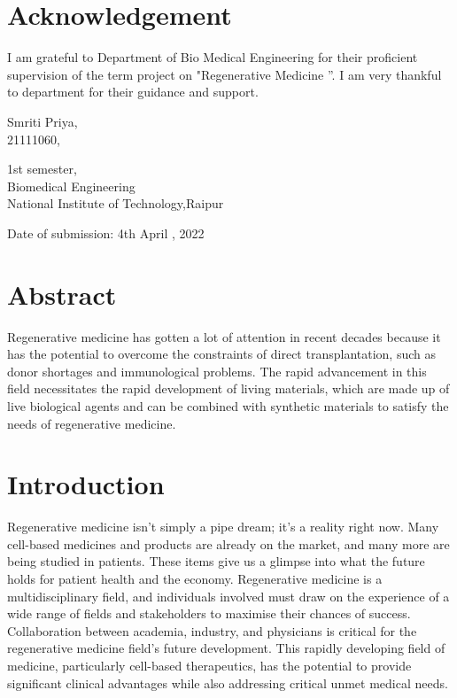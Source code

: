 \documentclass[12pt]{article}
\begin{document}
\newpage
\centering
\section*{\Huge Acknowledgement}
\vspace{3mm}
\raggedright
\LARGE I am grateful to Department of Bio Medical Engineering for their proficient supervision of the term project on "Regenerative Medicine ”. I am very thankful to department for their guidance and support.\\
	
\raggedleft

\vspace{45mm}

Smriti Priya,
\\21111060,


1st semester,
\\ Biomedical Engineering
\\National Institute of Technology,Raipur

\raggedright 
\vspace{110mm}
Date of submission: 4th April , 2022
\newpage
\centering 
\section*{ \Huge Abstract }
\vspace{3mm}
\Large
\raggedright
Regenerative medicine has gotten a lot of attention in recent decades because it has the potential to overcome the constraints of direct transplantation, such as donor shortages and immunological problems. The rapid advancement in this field necessitates the rapid development of living materials, which are made up of live biological agents and can be combined with synthetic materials to satisfy the needs of regenerative medicine. 



\centering \section*{\Huge Introduction }
\Large

\raggedright
Regenerative medicine isn't simply a pipe dream; it's a reality right now. Many cell-based medicines and products are already on the market, and many more are being studied in patients. These items give us a glimpse into what the future holds for patient health and the economy. Regenerative medicine is a multidisciplinary field, and individuals involved must draw on the experience of a wide range of fields and stakeholders to maximise their chances of success. Collaboration between academia, industry, and physicians is critical for the regenerative medicine field's future development. This rapidly developing field of medicine, particularly cell-based therapeutics, has the potential to provide significant clinical advantages while also addressing critical unmet medical needs.
\end{document}
